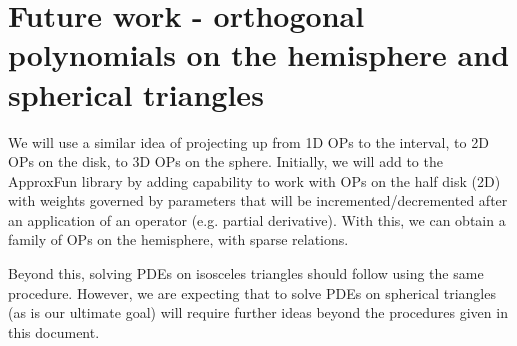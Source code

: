 \documentclass[11pt, oneside]{article}   	%
\begin{document}
\section{Future work - orthogonal polynomials on the hemisphere and spherical triangles}

We will use a similar idea of projecting up from 1D OPs to the interval, to 2D OPs on the disk, to 3D OPs on the sphere. Initially, we will add to the ApproxFun library by adding capability to work with OPs on the half disk (2D) with weights governed by parameters that will be incremented/decremented after an application of an operator (e.g. partial derivative). With this, we can obtain a family of OPs on the hemisphere, with sparse relations.

Beyond this, solving PDEs on isosceles triangles should follow using the same procedure. However, we are expecting that to solve PDEs on spherical triangles (as is our ultimate goal) will require further ideas beyond the procedures given in this document.



\end{document}
